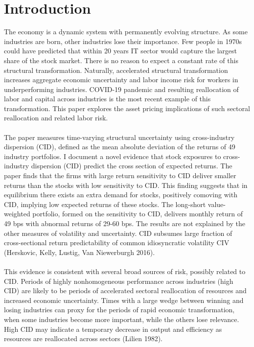\documentclass[12pt]{article}
\begin{document}
\section{Introduction} \label{sec:Model}
The economy is a dynamic system with permanently evolving structure. As some industries are born, other industries lose their importance. Few people in 1970s could have predicted that within 20 years IT sector would capture the largest share of the stock market. There is no reason to expect a constant rate of this structural transformation. Naturally, accelerated structural transformation increases aggregate economic uncertainty and labor income risk for workers in underperforming industries. COVID-19 pandemic and resulting reallocation of labor and capital across industries is the most recent example of this transformation. This paper explores the asset pricing implications of such sectoral reallocation and related labor risk. 
\paragraph{}
The paper measures time-varying structural uncertainty using cross-industry dispersion (CID), defined as the mean absolute deviation of the returns of 49 industry portfolios. I document a novel evidence that stock exposures to cross-industry dispersion (CID) predict the cross section of expected returns. The paper finds that the firms with large return sensitivity to CID deliver smaller returns than the stocks with low sensitivity to CID. This finding suggests that in equilibrium there exists an extra demand for stocks, positively comoving with CID, implying low expected returns of these stocks. The long-short value-weighted portfolio, formed on the sensitivity to CID, delivers monthly return of 49 bps with abnormal returns of 29-60 bps. The results are not explained by the other measures of volatility and uncertainty. CID subsumes large fraction of cross-sectional return predictability of common idiosyncratic volatility CIV (Herskovic, Kelly, Lustig, Van Niewerburgh 2016). 
\paragraph{}
This evidence is consistent with several broad sources of risk, possibly related to CID. Periods of highly nonhomogeneous performance across industries (high CID) are likely to be periods of accelerated sectoral reallocation of resources and increased economic uncertainty. Times with a large wedge between winning and losing industries can proxy for the periods of rapid economic transformation, when some industries become more important, while the others lose relevance. High CID may indicate a temporary decrease in output and efficiency as resources are reallocated across sectors (Lilien 1982). 
\end{document}
